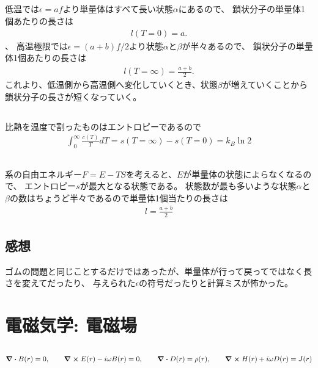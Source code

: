 \documentclass[../../master.tex]{subfiles}
\begin{document}
\subsection{}
低温では\(\epsilon=af\)より単量体はすべて長い状態\(\alpha\)にあるので、
鎖状分子の単量体1個あたりの長さは
\begin{align}
    l(T=0) = a.
\end{align}、
高温極限では\(\epsilon=(a+b)f/2\)より状態\(\alpha\)と\(\beta\)が半々あるので、
鎖状分子の単量体1個あたりの長さは
\begin{align}
    l(T=\infty) = \frac{a+b}{2}.
\end{align}
これより、低温側から高温側へ変化していくとき、状態\(\beta\)が増えていくことから
鎖状分子の長さが短くなっていく。

\subsection{}
比熱を温度で割ったものはエントロピーであるので
\begin{align}
    \int_{0}^{\infty} \frac{c(T)}{T} dT = s(T=\infty) - s(T=0) = k_B\ln 2
\end{align}

\subsection{}
系の自由エネルギー\(F=E-TS\)を考えると、\(E\)が単量体の状態によらなくなるので、
エントロピー\(s\)が最大となる状態である。
状態数が最も多いような状態\(\alpha\)と\(\beta\)の数はちょうど半々であるので単量体1個当たりの長さは
\begin{align}
    l=\frac{a+b}{2}
\end{align}

\subsection*{感想}
ゴムの問題と同じことするだけではあったが、単量体が行って戻ってではなく長さを変えてだったり、
与えられた\(\epsilon\)の符号だったりと計算ミスが怖かった。

\section{電磁気学: 電磁場}
\subsection{}
\begin{align}
    \div B(r) = 0,\qquad \curl E(r) -i\omega B(r)=0, \qquad \div D(r) = \rho(r),\qquad \curl H(r) + i\omega D(r) = J(r)
\end{align}
\end{document}
